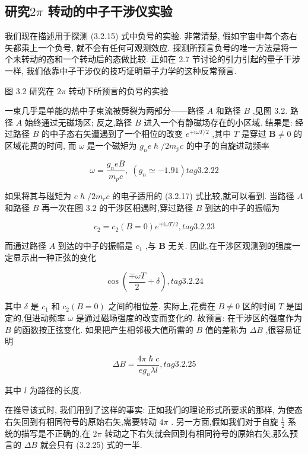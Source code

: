 \subsection{研究$2\pi$ 转动的中子干涉仪实验}

我们现在描述用于探测 (3.2.15) 式中负号的实验. 非常清楚, 假如宇宙中每个态右矢都乘上一个负号, 就不会有任何可观测效应. 探测所预言负号的唯一方法是将一个未转动的态和一个转动后的态做比较. 正如在 2.7 节讨论的引力引起的量子干涉一样, 我们依靠中子干涉仪的技巧证明量子力学的这种反常预言.



图 3.2 研究在 ${2\pi }$ 转动下所预言的负号的实验

一束几乎是单能的热中子束流被劈裂为两部分——路径 $A$ 和路径 $B$ ,见图 3.2. 路径 $A$ 始终通过无磁场区; 反之,路径 $B$ 进入一个有静磁场存在的小区域. 结果是: 经过路径 $B$ 的中子态右矢遭遇到了一个相位的改变 ${e}^{+{i\omega T}/2}$ ,其中 $T$ 是穿过 $\mathbf{B} \neq 0$ 的区域花费的时间, 而 $\omega$ 是一个磁矩为 ${g}_{n}e\hslash /2{m}_{p}c$ 的中子的自旋进动频率

$$
\omega = \frac{{g}_{n}{eB}}{{m}_{p}c},\;\left( {{g}_{n} \simeq - {1.91}}\right) tag{3.2.22}
$$

如果将其与磁矩为 $e\hslash /2{m}_{r}c$ 的电子适用的 (3.2.17) 式比较,就可以看到. 当路径 $A$ 和路径 $B$ 再一次在图 3.2 的干涉区相遇时,穿过路径 $B$ 到达的中子的振幅为

$$
{c}_{2} = {c}_{2}\left( {B = 0}\right) {e}^{\mp {i\omega T}/2}, tag{3.2.23}
$$

而通过路径 $A$ 到达的中子的振幅是 ${c}_{1}$ ,与 $\mathbf{B}$ 无关. 因此,在干涉区观测到的强度一定显示出一种正弦的变化

$$
\cos \left( {\frac{\mp {\omega T}}{2} + \delta }\right) , tag{3.2.24}
$$

其中 $\delta$ 是 ${c}_{1}$ 和 ${c}_{2}\left( {B = 0}\right)$ 之间的相位差. 实际上,花费在 $B \neq 0$ 区的时间 $T$ 是固定的,但进动频率 $\omega$ 是通过磁场强度的改变而变化的. 故预言: 在干涉区的强度作为 $B$ 的函数按正弦变化. 如果把产生相邻极大值所需的 $B$ 值的差称为 ${\Delta B}$ ,很容易证明

$$
{\Delta B} = \frac{{4\pi }\hslash c}{e{g}_{n}{\lambda l}}, tag{3.2.25}
$$

其中 $l$ 为路径的长度.

在推导该式时, 我们用到了这样的事实: 正如我们的理论形式所要求的那样, 为使态右矢回到有相同符号的原始右矢,需要转动 ${4\pi }$ . 另一方面,假如我们对于自旋 $\frac{1}{2}$ 系统的描写是不正确的,在 ${2\pi }$ 转动之下右矢就会回到有相同符号的原始右矢,那么预言的 ${\Delta B}$ 就会只有 (3.2.25) 式的一半.

